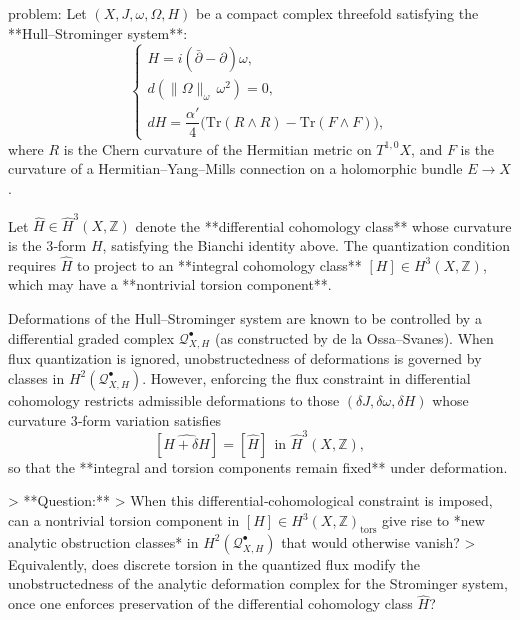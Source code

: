 problem:  
Let \( (X, J, \omega, \Omega, H) \) be a compact complex threefold satisfying the **Hull–Strominger system**:
\[
\begin{cases}
H = i(\bar{\partial} - \partial)\omega, \\[4pt]
d(\|\Omega\|_\omega\, \omega^2) = 0, \\[4pt]
dH = \dfrac{\alpha'}{4}\big(\mathrm{Tr}(R \wedge R) - \mathrm{Tr}(F \wedge F)\big),
\end{cases}
\]
where \(R\) is the Chern curvature of the Hermitian metric on \(T^{1,0}X\), and \(F\) is the curvature of a Hermitian–Yang–Mills connection on a holomorphic bundle \(E \to X\).

Let \(\widehat{H} \in \widehat{H}^3(X,\mathbb{Z})\) denote the **differential cohomology class** whose curvature is the 3‑form \(H\), satisfying the Bianchi identity above.  
The quantization condition requires \(\widehat{H}\) to project to an **integral cohomology class** \([H] \in H^3(X,\mathbb{Z})\), which may have a **nontrivial torsion component**.

Deformations of the Hull–Strominger system are known to be controlled by a differential graded complex \(\mathcal{Q}_{X,H}^\bullet\) (as constructed by de la Ossa–Svanes). When flux quantization is ignored, unobstructedness of deformations is governed by classes in \(H^2(\mathcal{Q}_{X,H}^\bullet)\).  
However, enforcing the flux constraint in differential cohomology restricts admissible deformations to those \((\delta J, \delta \omega, \delta H)\) whose curvature 3‑form variation satisfies
\[
[\widehat{H + \delta H}] = [\widehat{H}] \ \ \text{in } \widehat{H}^3(X,\mathbb{Z}),
\]
so that the **integral and torsion components remain fixed** under deformation.

> **Question:**  
> When this differential‑cohomological constraint is imposed, can a nontrivial torsion component in \([H] \in H^3(X,\mathbb{Z})_{\mathrm{tors}}\) give rise to *new analytic obstruction classes* in \(H^2(\mathcal{Q}_{X,H}^\bullet)\) that would otherwise vanish?  
> Equivalently, does discrete torsion in the quantized flux modify the unobstructedness of the analytic deformation complex for the Strominger system, once one enforces preservation of the differential cohomology class \(\widehat{H}\)?

